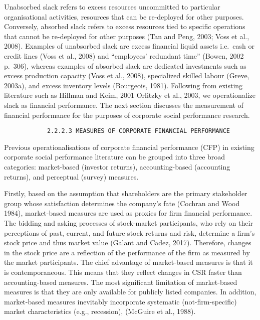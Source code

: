 \documentclass[
]{mitthesis}
\begin{document}
Unabsorbed slack refers to excess resources uncommitted to particular organisational activities, resources that can be re-deployed for other purposes. Conversely, absorbed slack refers to excess resources tied to specific operations that cannot be re-deployed for other purposes (Tan and Peng, 2003; Voss et al., 2008). Examples of unabsorbed slack are excess financial liquid assets i.e.~cash or credit lines (Voss et al., 2008) and ``employees' redundant time'' (Bowen, 2002 p.~306), whereas examples of absorbed slack are dedicated investments such as excess production capacity (Voss et al., 2008), specialized skilled labour (Greve, 2003a), and excess inventory levels (Bourgeois, 1981). Following from existing literature such as Hillman and Keim, 2001 Orlitzky et al., 2003, we operationalize slack as financial performance. The next section discusses the measurement of financial performance for the purposes of corporate social performance research.

\begin{verbatim}
            2.2.2.3 MEASURES OF CORPORATE FINANCIAL PERFORMANCE
\end{verbatim}

Previous operationalisations of corporate financial performance (CFP) in existing corporate social performance literature can be grouped into three broad categories: market-based (investor returns), accounting-based (accounting returns), and perceptual (survey) measures.

Firstly, based on the assumption that shareholders are the primary stakeholder group whose satisfaction determines the company's fate (Cochran and Wood 1984), market-based measures are used as proxies for firm financial performance. The bidding and asking processes of stock-market participants, who rely on their perceptions of past, current, and future stock returns and risk, determine a firm's stock price and thus market value (Galant and Cadez, 2017). Therefore, changes in the stock price are a reflection of the performance of the firm as measured by the market participants. The chief advantage of market-based measures is that it is contemporaneous. This means that they reflect changes in CSR faster than accounting-based measures. The most significant limitation of market-based measures is that they are only available for publicly listed companies. In addition, market-based measures inevitably incorporate systematic (not-firm-specific) market characteristics (e.g., recession), (McGuire et al., 1988).
\end{document}
